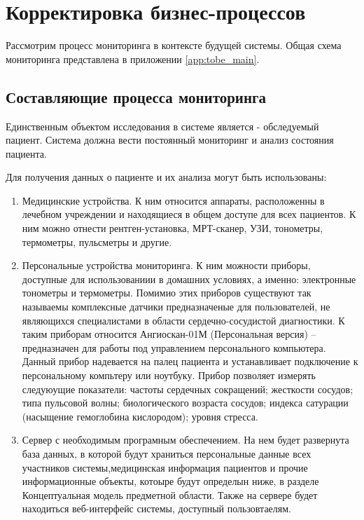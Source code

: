 \newpage
\section{Корректировка бизнес-процессов}
Рассмотрим процесс мониторинга в контексте будущей системы. Общая схема
мониторинга представлена в приложении  \ref{app:tobe_main}.

\subsection{Составляющие процесса мониторинга}

Единственным объектом исследования в системе является - обследуемый пациент.
Система должна вести постоянный мониторинг и анализ состояния пациента.

Для получения данных о пациенте и их анализа могут быть использованы:

\begin{enumerate}
  \item Медицинские устройства. К ним относится аппараты, расположенны в
  лечебном учреждении и находящиеся в общем доступе для всех пациентов. К ним
  можно отнести рентген-установка, МРТ-сканер, УЗИ, тонометры, термометры,
  пульсметры и другие.
  \item Персональные устройства мониторинга. К ним можности приборы, доступные
  для использованиии в домашних условиях, а именно: электронные тонометры и
  термометры. Помимио этих приборов существуют так называемы комплексные датчики
  предназначеные для пользователей, не являющихся специалистами в области
  сердечно-сосудистой диагностики. К таким приборам относится Ангиоскан-01М
  (Персональная версия) – предназначен для работы под управлением персонального
  компьютера. Данный прибор надевается на палец пациента и устанавливает
  подключение к персональному компьтеру или ноутбуку. Прибор позволяет измерять
  следуюущие показатели: частоты сердечных сокращений; жесткости сосудов; типа
  пульсовой волны; биологического возраста сосудов; индекса сатурации (насыщение
  гемоглобина кислородом); уровня стресса.
  \item Сервер с необходимым програмным обеспечением. На нем будет развернута
  база данных, в которой будут храниться персональные данные всех участников
  системы,медицинская информация пациентов и прочие информационные объекты,
  котоыре будут определын ниже,  в разделе Концептуальная модель предметной
  области. Также на сервере будет находиться веб-интерфейс системы, доступный
  пользовтаелям.
\end{enumerate}

